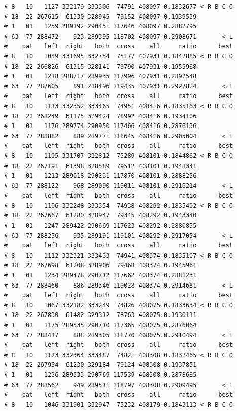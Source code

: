 \documentclass{article}\usepackage[]{graphicx}\usepackage[]{color}
\makeatletter
\newenvironment{kframe}{%
 \def\at@end@of@kframe{}%
 \ifinner\ifhmode%
  \def\at@end@of@kframe{\end{minipage}}%
  \begin{minipage}{\columnwidth}%
 \fi\fi%
 \def\FrameCommand##1{\hskip\@totalleftmargin \hskip-\fboxsep
 \colorbox{shadecolor}{##1}\hskip-\fboxsep
     \hskip-\linewidth \hskip-\@totalleftmargin \hskip\columnwidth}%
 \MakeFramed {\advance\hsize-\width
   \@totalleftmargin\z@ \linewidth\hsize
   \@setminipage}}%
 {\par\unskip\endMakeFramed%
 \at@end@of@kframe}
\newenvironment{knitrout}{}{} %
\makeatother
\begin{document}
\begin{knitrout}
\begin{kframe}
\begin{verbatim}
# 8   10   1127 332179 333306  74791 408097 0.1832677 < R B C O
# 18  22 267615  61330 328945  79152 408097 0.1939539          
# 1   01   1259 289192 290451 117646 408097 0.2882795          
# 63  77 288472    923 289395 118702 408097 0.2908671       < L
#    pat   left  right   both  cross    all     ratio      best
# 8   10   1059 331695 332754  75177 407931 0.1842885 < R B C O
# 18  22 266826  61315 328141  79790 407931 0.1955968          
# 1   01   1218 288717 289935 117996 407931 0.2892548          
# 63  77 287605    891 288496 119435 407931 0.2927824       < L
#    pat   left  right   both  cross    all     ratio      best
# 8   10   1113 332352 333465  74951 408416 0.1835163 < R B C O
# 18  22 268249  61175 329424  78992 408416 0.1934106          
# 1   01   1176 289774 290950 117466 408416 0.2876136          
# 63  77 288882    889 289771 118645 408416 0.2905004       < L
#    pat   left  right   both  cross    all     ratio      best
# 8   10   1105 331707 332812  75289 408101 0.1844862 < R B C O
# 18  22 267191  61398 328589  79512 408101 0.1948341          
# 1   01   1213 289018 290231 117870 408101 0.2888256          
# 63  77 288122    968 289090 119011 408101 0.2916214       < L
#    pat   left  right   both  cross    all     ratio      best
# 8   10   1106 332248 333354  74938 408292 0.1835402 < R B C O
# 18  22 267667  61280 328947  79345 408292 0.1943340          
# 1   01   1247 289422 290669 117623 408292 0.2880855          
# 63  77 288256    935 289191 119101 408292 0.2917054       < L
#    pat   left  right   both  cross    all     ratio      best
# 8   10   1112 332321 333433  74941 408374 0.1835107 < R B C O
# 18  22 267698  61208 328906  79468 408374 0.1945961          
# 1   01   1234 289478 290712 117662 408374 0.2881231          
# 63  77 288460    886 289346 119028 408374 0.2914681       < L
#    pat   left  right   both  cross    all     ratio      best
# 8   10   1067 332182 333249  74826 408075 0.1833634 < R B C O
# 18  22 267830  61482 329312  78763 408075 0.1930111          
# 1   01   1175 289535 290710 117365 408075 0.2876064          
# 63  77 288417    888 289305 118770 408075 0.2910494       < L
#    pat   left  right   both  cross    all     ratio      best
# 8   10   1123 332364 333487  74821 408308 0.1832465 < R B C O
# 18  22 267954  61230 329184  79124 408308 0.1937851          
# 1   01   1236 289533 290769 117539 408308 0.2878685          
# 63  77 288562    949 289511 118797 408308 0.2909495       < L
#    pat   left  right   both  cross    all     ratio      best
# 8   10   1046 331901 332947  75232 408179 0.1843113 < R B C O

\end{verbatim}
\end{kframe}
\end{knitrout}
\end{document}
